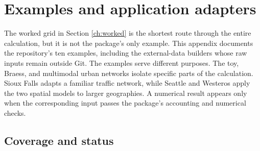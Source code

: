 \section{Examples and application adapters}
\label{app:additional-examples}

The worked grid in Section \ref{ch:worked} is the shortest route through the
entire calculation, but it is not the package's only example. This appendix
documents the repository's ten examples, including the
external-data builders whose raw inputs remain outside Git. The examples serve
different purposes. The toy, Braess, and multimodal urban networks isolate
specific parts of the calculation. Sioux Falls adapts a familiar traffic
network, while Seattle and Westeros apply the two spatial models to larger
geographies. A numerical result appears only when the corresponding input
passes the package's accounting and numerical checks.

\subsection{Coverage and status}

